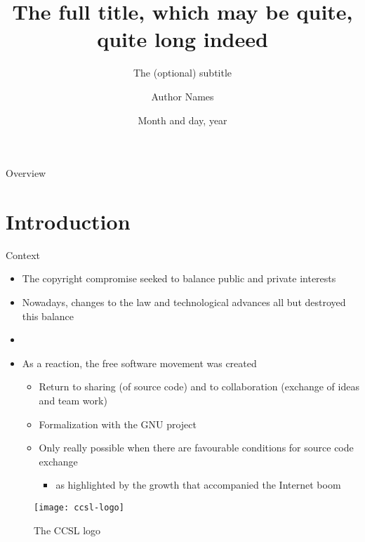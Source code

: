 \documentclass[
  xcolor={hyperref,svgnames,x11names,table},
  hyperref={pdfencoding=unicode,plainpages=false,pdfpagelabels=true,breaklinks=true},
  brazilian,english,12pt,aspectratio=149,
]{beamer}
\title[The shortened title]{The full title, which may be quite,\\
                            quite long indeed}
\subtitle{The (optional) subtitle}
\author[Shortened Author Names]{Author Names}
\institute{\textbf{Workshop Name}\\Computer Science Department\\IME USP}
\date{Month and day, year}
\begin{document}
\maketitle

\showqrcode

\begin{frame}[t]{Overview}
  \overview
\end{frame}

\section{Introduction}

\begin{frame}{Context}
  \begin{itemize}
    \item The copyright compromise seeked to balance public and private interests
    \item Nowadays, changes to the law and technological advances all but destroyed this balance
    \item[]\strut %
    \item As a reaction, the free software movement was created
    \begin{itemize}
      \item Return to sharing (of source code) and to collaboration (exchange of ideas and team work)
      \item Formalization with the GNU project
      \item Only really possible when there are favourable conditions for source code exchange
      \begin{itemize}
        \item as highlighted by the growth that accompanied the Internet boom
      \end{itemize}
    \end{itemize}
  \end{itemize}

\end{frame}

\begin{frame}[plain]
  \begin{figure}[H]
    \texttt{[image: ccsl-logo]}
    \caption*{The CCSL logo} %
  \end{figure}
\end{frame}
\end{document}
